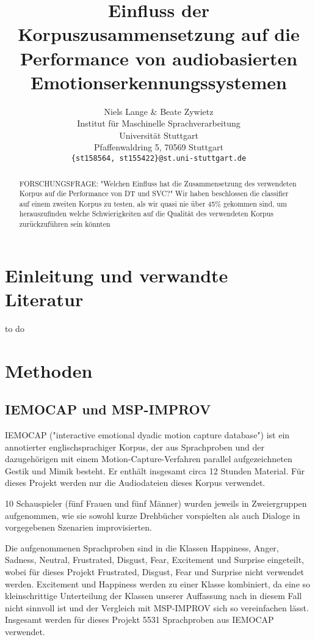 \documentclass{article} %
\title{Einfluss der Korpuszusammensetzung auf die Performance von audiobasierten Emotionserkennungssystemen}
\author{Niels Lange \& Beate Zywietz\\
Institut für Maschinelle Sprachverarbeitung\\
Universität Stuttgart\\
Pfaffenwaldring 5, 70569 Stuttgart \\
\texttt{\{st158564, st155422\}@st.uni-stuttgart.de} \\
}
\begin{document}
\maketitle
\begin{abstract}

FORSCHUNGSFRAGE: "Welchen Einfluss hat die Zusammensetzung des verwendeten Korpus auf die Performance von DT und SVC?"
Wir haben beschlossen die classifier auf einem zweiten Korpus zu testen, als wir quasi nie über 45\% gekommen sind, um herauszufinden welche Schwierigkeiten auf die Qualität des verwendeten Korpus zurückzuführen sein könnten
\end{abstract}

\section{Einleitung und verwandte Literatur}

to do

\section{Methoden}

\subsection{IEMOCAP und MSP-IMPROV}

IEMOCAP ("interactive emotional dyadic motion capture
database") ist ein annotierter englischsprachiger Korpus, der aus Sprachproben und der dazugehörigen mit einem Motion-Capture-Verfahren parallel aufgezeichneten Gestik und Mimik besteht. Er enthält insgesamt circa 12 Stunden Material. Für dieses Projekt werden nur die Audiodateien dieses Korpus verwendet. 

10 Schauspieler (fünf Frauen und fünf Männer) wurden jeweils in Zweiergruppen aufgenommen, wie sie sowohl kurze Drehbücher vorspielten als auch Dialoge in vorgegebenen Szenarien improvisierten. 

Die aufgenommenen Sprachproben sind in die Klassen Happiness, Anger, Sadness, Neutral, Frustrated, Disgust, Fear, Excitement und Surprise eingeteilt, wobei für dieses Projekt Frustrated, Disgust, Fear und Surprise nicht verwendet werden. Excitement und Happiness werden zu einer Klasse kombiniert, da eine so kleinschrittige Unterteilung der Klassen unserer Auffassung nach in diesem Fall nicht sinnvoll ist und der Vergleich mit MSP-IMPROV sich so vereinfachen lässt. Insgesamt werden für dieses Projekt 5531 Sprachproben aus IEMOCAP verwendet. 
\end{document}
